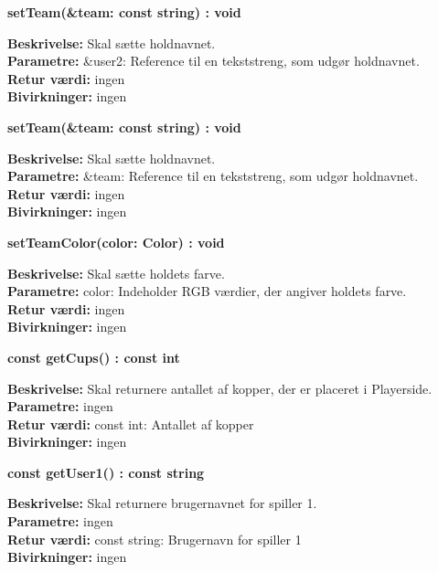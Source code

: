 \documentclass[Arkitektur/System_main.tex]{subfiles}
\begin{document}
\textbf{setTeam(&team: const string) : void}
\begin{adjustwidth}{1cm}{0pt}
\textbf{Beskrivelse:} Skal sætte holdnavnet.\\
\textbf{Parametre:} &user2: Reference til en tekststreng, som udgør holdnavnet. \\[0.2cm]
\textbf{Retur værdi:} ingen \\[0.2cm]
\textbf{Bivirkninger:} ingen \\[0.2cm]
\end{adjustwidth}

\textbf{setTeam(\&team: const string) : void}
\begin{adjustwidth}{1cm}{0pt}
\textbf{Beskrivelse:} Skal sætte holdnavnet.\\
\textbf{Parametre:} &team: Reference til en tekststreng, som udgør holdnavnet. \\[0.2cm]
\textbf{Retur værdi:} ingen \\[0.2cm]
\textbf{Bivirkninger:} ingen \\[0.2cm]
\end{adjustwidth}

\textbf{setTeamColor(color: Color) : void}
\begin{adjustwidth}{1cm}{0pt}
\textbf{Beskrivelse:} Skal sætte holdets farve.\\
\textbf{Parametre:} color: Indeholder RGB værdier, der angiver holdets farve. \\[0.2cm]
\textbf{Retur værdi:} ingen \\[0.2cm]
\textbf{Bivirkninger:} ingen \\[0.2cm]
\end{adjustwidth}

\textbf{const getCups() : const int}
\begin{adjustwidth}{1cm}{0pt}
\textbf{Beskrivelse:} Skal returnere antallet af kopper, der er placeret i Playerside.\\
\textbf{Parametre:} ingen \\[0.2cm]
\textbf{Retur værdi:} const int: Antallet af kopper\\[0.2cm]
\textbf{Bivirkninger:} ingen \\[0.2cm]
\end{adjustwidth}

\textbf{const getUser1() : const string}
\begin{adjustwidth}{1cm}{0pt}
\textbf{Beskrivelse:} Skal returnere brugernavnet for spiller 1.\\
\textbf{Parametre:} ingen \\[0.2cm]
\textbf{Retur værdi:} const string: Brugernavn for spiller 1\\[0.2cm]
\textbf{Bivirkninger:} ingen \\[0.2cm]
\end{adjustwidth}
\end{document}
